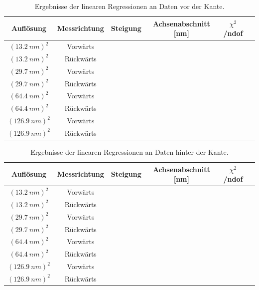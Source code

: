 \documentclass[12pt,a4paper]{article}
\begin{document}
\begin{table}
\centering
\begin{tabular}{|c|c|c|c|c|c|}
\hline 
Auflösung & Messrichtung & Steigung & Achsenabschnitt [nm] & $\chi ^2$/ndof \\ 
\hline 
$(\SI{13,2}{nm})^2$ & Vorwärts &  & & \\
\hline 
$(\SI{13,2}{nm})^2$ & Rückwärts &   & &\\
\hline 
$(\SI{29,7}{nm})^2$ & Vorwärts &  & &\\
\hline 
$(\SI{29,7}{nm})^2$ & Rückwärts &  & &\\
\hline 
$(\SI{64,4}{nm})^2$ & Vorwärts &  & &\\
\hline 
$(\SI{64,4}{nm})^2$ & Rückwärts &  & &\\
\hline 
$(\SI{126,9}{nm})^2$ & Vorwärts &  & &\\
\hline 
$(\SI{126,9}{nm})^2$ & Rückwärts &  & &\\
\hline
\end{tabular} 
\caption{Ergebnisse der linearen Regressionen an Daten vor der Kante.}
\label{tab:Kante_linreg_vor_Ergebnisse}
\end{table}

\begin{table}
\centering
\begin{tabular}{|c|c|c|c|c|c|}
\hline 
Auflösung & Messrichtung & Steigung & Achsenabschnitt [nm] & $\chi ^2$/ndof \\ 
\hline 
$(\SI{13,2}{nm})^2$ & Vorwärts &  & & \\
\hline 
$(\SI{13,2}{nm})^2$ & Rückwärts &   & &\\
\hline 
$(\SI{29,7}{nm})^2$ & Vorwärts &  & &\\
\hline 
$(\SI{29,7}{nm})^2$ & Rückwärts &  & &\\
\hline 
$(\SI{64,4}{nm})^2$ & Vorwärts &  & &\\
\hline 
$(\SI{64,4}{nm})^2$ & Rückwärts &  & &\\
\hline 
$(\SI{126,9}{nm})^2$ & Vorwärts &  & &\\
\hline 
$(\SI{126,9}{nm})^2$ & Rückwärts &  & &\\
\hline 
\end{tabular} 
\caption{Ergebnisse der linearen Regressionen an Daten hinter der Kante.}
\label{tab:Kante_linreg_nach_Ergebnisse}
\end{table}
\end{document}
